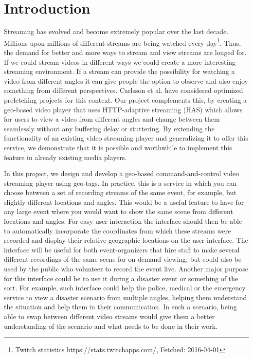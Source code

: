 \chapter{Introduction}
\label{cha:introduction}

Streaming has evolved and become extremely popular over the last decade. Millions upon millions of different streams are being watched every day\footnote{Twitch statistics https://stats.twitchapps.com/, Fetched: 2016-04-01}. Thus, the demand for better and more ways to stream and view streams are longed for. If we could stream videos in different ways we could create a more interesting streaming environment. If a stream can provide the possibility for watching a video from different angles it can give people the option to observe and also enjoy something from different perspectives. Carlsson et al.\cite{optimizedstreaming} have considered optimized prefetching projects for this context. Our project complements this, by creating a geo-based video player that uses HTTP-adaptive streaming (HAS) which allows for users to view a video from different angles and change between them seamlessly without any buffering delay or stuttering. By extending the functionality of an existing video streaming player and generalizing it to offer this service, we demonstrate that it is possible and worthwhile to implement this feature in already existing media players.

In this project, we design and develop a geo-based command-and-control video streaming player using geo-tags. In practice, this is a service in which you can choose between a set of recording streams of the same event, for example, but slightly different locations and angles. This would be a useful feature to have for any large event where you would want to show the same scene from different locations and angles. For easy user interaction the interface should then be able to automatically incorporate the coordinates from which these streams were recorded and display their relative geographic locations on the user interface. The interface will be useful for both event-organizers that hire staff to make several different recordings of the same scene for on-demand viewing, but could also be used by the public who volunteer to record the event live. Another major purpose for this interface could be to use it during a disaster event or something of the sort. For example, such interface could help the police, medical or the emergency service to view a disaster scenario from multiple angles, helping them understand the situation and help them in their communication. In such a scenario, being able to swap between different video streams would give them a better understanding of the scenario and what needs to be done in their work.

